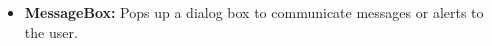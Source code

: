 \documentclass[12pt,a4paper]{article}
\begin{document}
\begin{itemize}




    \item \textbf{MessageBox:} Pops up a dialog box to communicate messages or alerts to the user.


    \end{itemize}
\end{document}
